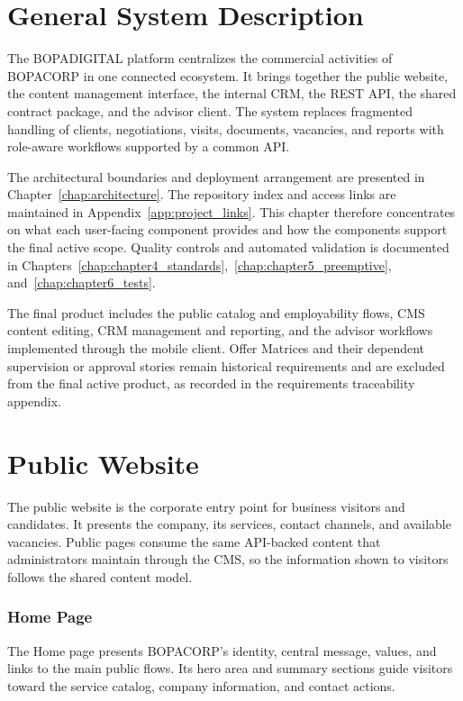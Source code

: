 \documentclass[letterpaper%
, oneside%
, 12pt%
, memoireprojet%
, english%
,creativecommons,hyperref, withAlgo2e %
]{thETS}
\begin{document}
\section{General System Description}
The BOPADIGITAL platform centralizes the commercial activities of BOPACORP in one connected
ecosystem. It brings together the public website, the content management interface, the internal
CRM, the REST API, the shared contract package, and the advisor client. The system replaces
fragmented handling of clients, negotiations, visits, documents, vacancies, and reports with
role-aware workflows supported by a common API.

The architectural boundaries and deployment arrangement are presented in
Chapter~\ref{chap:architecture}. The repository index and access links are maintained in
Appendix~\ref{app:project_links}. This chapter therefore concentrates on what each user-facing
component provides and how the components support the final active scope. Quality controls and
automated validation is documented in Chapters~\ref{chap:chapter4_standards},~\ref{chap:chapter5_preemptive},
and~\ref{chap:chapter6_tests}.

The final product includes the public catalog and employability flows, CMS content editing, CRM
management and reporting, and the advisor workflows implemented through the mobile client. Offer
Matrices and their dependent supervision or approval stories remain historical requirements and
are excluded from the final active product, as recorded in the requirements traceability appendix.

\section{Public Website}
The public website is the corporate entry point for business visitors and candidates. It presents
the company, its services, contact channels, and available vacancies. Public pages consume the
same API-backed content that administrators maintain through the CMS, so the information shown to
visitors follows the shared content model.

\subsubsection{Home Page}
The Home page presents BOPACORP's identity, central message, values, and links to the main public
flows. Its hero area and summary sections guide visitors toward the service catalog, company
information, and contact actions.
\end{document}
